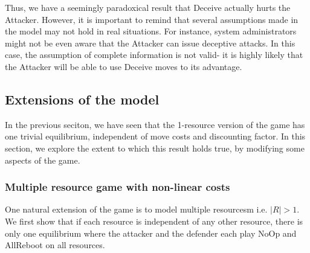 \documentclass[11pt]{article}
\theoremstyle{plain}
\newtheorem*{definition}{Definition}
\begin{document}
Thus, we have a seemingly paradoxical result that Deceive actually hurts the Attacker. However, it is important to remind that several assumptions made in the model may not hold in real situations. For instance, system administrators might not be even aware that the Attacker can issue deceptive attacks. In this case, the assumption of complete information is not valid- it is highly likely that the Attacker will be able to use Deceive moves to its advantage. 

\subsection{Extensions of the model} 
In the previous seciton, we have seen that the 1-resource version of the game has one trivial equilibrium, independent of move costs and discounting factor. In this section, we explore the extent to which this result holds true, by modifying some aspects of the game.

\subsubsection{Multiple resource game with non-linear costs}
One natural extension of the game is to model multiple resourcesm i.e. $|R|>1$. We first show that if each resource is independent of any other resource, there is only one equilibrium where the attacker and the defender each play NoOp and AllReboot on all resources. 

\begin{comment}
\begin{definition}
Let $O = \{ O_1, O_2, ... ,O_m \}$ be the set of $m$ resources in the extended model. We say that $O$ is independent if for all $t$,
$$\sum_{n=1}^{m} G_{O_n}(t) = G(t) \text{ and } \sum_{n=1}^{m} C_{O_n}(t) = C(t)$$
for all $ j \in \{1,2,..,m\}$,
We say that a resource is independent if the cost and benefit from the resource is determined only by the control state of the resource.
\end{definition}
\end{comment}

\end{document}
